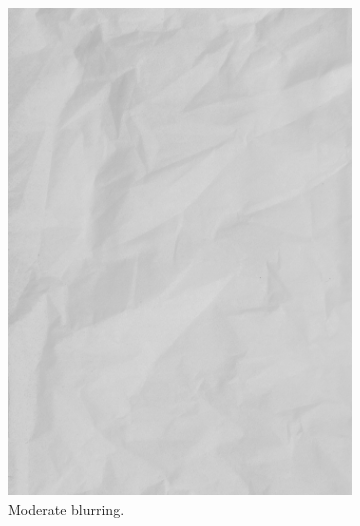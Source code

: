 \begin{figure}
\begin{subfigure}{0.3\textwidth}
        \includegraphics[width=\textwidth]{images/002.jpg}
        \caption{Moderate blurring.}
    \end{subfigure}
    \begin{subfigure}{0.3\textwidth}

\end{subfigure}
\end{figure}
